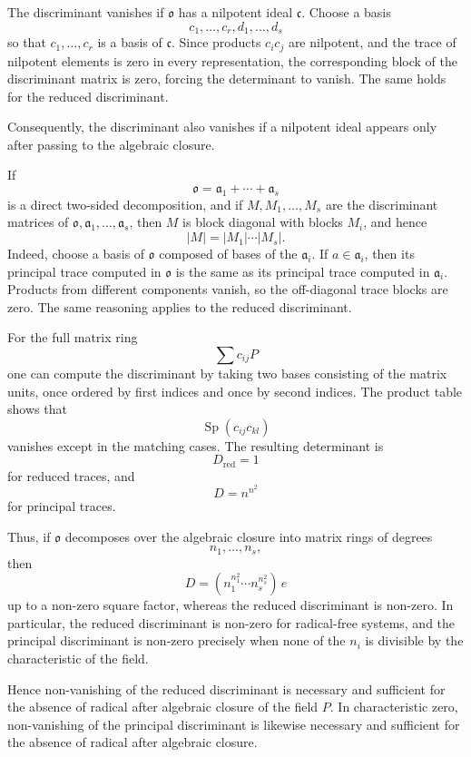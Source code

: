 \documentclass[
  11pt,
]{article}
\begin{document}
The discriminant vanishes if \(\mathfrak{o}\) has a nilpotent ideal
\(\mathfrak c\). Choose a basis \[
  c_1,\ldots,c_r,d_1,
\ldots,d_s
\] so that \(c_1,\ldots,c_r\) is a basis of \(\mathfrak c\). Since
products \(c_i c_j\) are nilpotent, and the trace of nilpotent elements
is zero in every representation, the corresponding block of the
discriminant matrix is zero, forcing the determinant to vanish. The same
holds for the reduced discriminant.

Consequently, the discriminant also vanishes if a nilpotent ideal
appears only after passing to the algebraic closure.

If \[
  \mathfrak{o}=\mathfrak a_1+
\cdots+
\mathfrak a_s
\] is a direct two-sided decomposition, and if \(M,M_1,\ldots,M_s\) are
the discriminant matrices of \(\mathfrak{o},\mathfrak a_1,
\ldots,\mathfrak a_s\), then \(M\) is block diagonal with blocks
\(M_i\), and hence \[
  |M|=|M_1|\cdots|M_s|.
\] Indeed, choose a basis of \(\mathfrak{o}\) composed of bases of the
\(\mathfrak a_i\). If \(a\in\mathfrak a_i\), then its principal trace
computed in \(\mathfrak{o}\) is the same as its principal trace computed
in \(\mathfrak a_i\). Products from different components vanish, so the
off-diagonal trace blocks are zero. The same reasoning applies to the
reduced discriminant.

For the full matrix ring \[
  \sum c_{ij}P
\] one can compute the discriminant by taking two bases consisting of
the matrix units, once ordered by first indices and once by second
indices. The product table shows that \[
  \operatorname{Sp}(c_{ij}c_{kl})
\] vanishes except in the matching cases. The resulting determinant is
\[
  D_{\mathrm{red}}=1
\] for reduced traces, and \[
  D=n^{n^2}
\] for principal traces.

Thus, if \(\mathfrak{o}\) decomposes over the algebraic closure into
matrix rings of degrees \[
  n_1,\ldots,n_s,
\] then \[
  D=(n_1^{n_1^2}\cdots n_s^{n_s^2})\,e
\] up to a non-zero square factor, whereas the reduced discriminant is
non-zero. In particular, the reduced discriminant is non-zero for
radical-free systems, and the principal discriminant is non-zero
precisely when none of the \(n_i\) is divisible by the characteristic of
the field.

Hence non-vanishing of the reduced discriminant is necessary and
sufficient for the absence of radical after algebraic closure of the
field \(P\). In characteristic zero, non-vanishing of the principal
discriminant is likewise necessary and sufficient for the absence of
radical after algebraic closure.
\end{document}
